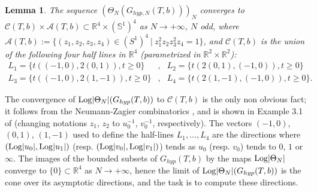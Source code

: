 \documentclass[11pt]{amsart}
\newtheorem{lem}[teo]{Lemma}
\newcommand{\mr}{\mathbb{R}}
\begin{document}
{\begin{lem}\label{lemYo} The sequence $\left(\Theta_N( G_{hyp,N}(T,b))\right)_N$ converges to $ \mathcal{C}(T,b)\times \mathcal{A}(T,b)\subset \mathbb{R}^{4}\times (\mathbb{S}^1)^4$ as $N\rightarrow +\infty$, $N$ odd, where $\mathcal{A}(T,b):= \{(z_1,z_2,z_3,z_4)\in (S^1)^4\ \vert \ z_1^2z_2z_3^2z_4=1\}$, and $\mathcal{C}(T,b)$ is the union of the following four half lines in $\mr^4$ (parametrized in $\mr^2\times \mr^2$):
$$\begin{array}{ccc} L_1 = \{t((-1,0),2(0,1)), t\geq 0\} & ,& L_2 = \{t(2(0,1),(-1,0)), t\geq 0\}\\
L_3 = \{t((-1,0),2(1,-1)), t\geq 0\} & , & L_4 = \{t(2(1,-1),(-1,0)), t\geq 0\}.
\end{array}$$ 
\end{lem}  
\proof The convergence of ${\rm Log}\vert \Theta_N\vert(G_{hyp}(T,b))$ to $\mathcal{C}(T,b)$ is the only non obvious fact; it follows from the Neumann-Zagier combinatorics \cite{NZ}, and is shown in Example 3.1 of \cite{Yo} (changing notations $z_1$, $z_2$ to $u_0^{-1}$, $v_0^{-1}$, respectively). The vectors $(-1,0)$, $(0,1)$, $(1,-1)$ used to define the half-lines $L_1,\ldots, L_4$ are the directions where $({\rm Log}\vert u_0\vert,{\rm Log}\vert u_1\vert)$ (resp. $({\rm Log}\vert v_0\vert,{\rm Log}\vert v_1\vert)$) tends as $u_0$ (resp. $v_0$) tends to $0$, $1$ or $\infty$. The images of the bounded subsets of $G_{hyp}(T,b)$ by the maps ${\rm Log}\vert \Theta_N\vert$ converge to $\{0\}\subset \mathbb{R}^{4}$ as $N\rightarrow +\infty$, hence the limit of ${\rm Log}\vert \Theta_N\vert(G_{hyp}(T,b))$ is the cone over its asymptotic directions, and the task is to compute these directions. 

}
\end{document}
